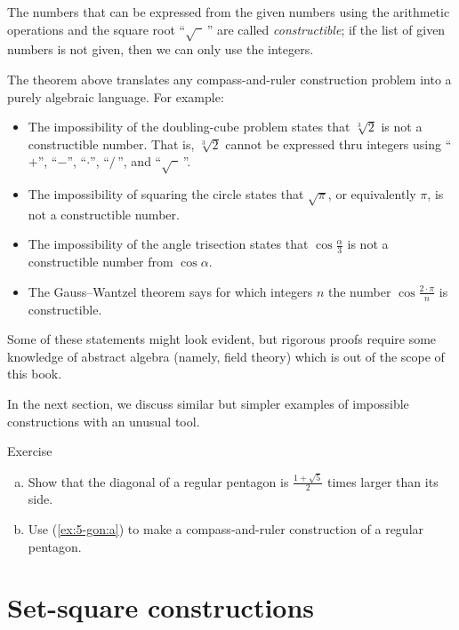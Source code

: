 The numbers that can be expressed from the given numbers using the arithmetic operations and the square root ``$\sqrt{\phantom{a}}\,$'' are called \emph{constructible};
if the list of given numbers is not given, then we can only use the integers.

{\sloppy
The theorem above translates any compass-and-ruler construction problem into a purely algebraic language.
For example:
\begin{itemize}
\item The impossibility of the doubling-cube problem states that $\sqrt[3]{2}$ is not a constructible number.
That is, $\sqrt[3]{2}$ cannot be expressed thru integers using
``$+$'', ``$-$'', ``$\cdot$'', ``$/\,$'', and ``$\sqrt{\phantom{a}}\,$''.

\item The impossibility of squaring the circle states that 
$\sqrt{\pi}$, or equivalently $\pi$, is not a constructible number.

\item The impossibility of the angle trisection states that $\cos\tfrac\alpha3$ is not a constructible number from $\cos\alpha$.

\item The Gauss--Wantzel theorem says for which integers $n$ the number 
$\cos\tfrac{2\cdot\pi}n$ is constructible.
\end{itemize} 
Some of these statements might look evident, 
but rigorous proofs require some knowledge of abstract algebra (namely, field theory)
which is out of the scope of this book. 

}

In the next section, we discuss similar but simpler examples of impossible constructions with an unusual tool.

\begin{thm}{Exercise}\label{ex:5-gon}
\begin{enumerate}[(a)]
 \item\label{ex:5-gon:a} Show that the diagonal of a regular pentagon is $\tfrac{1+\sqrt5}2$ times larger than its side.
 \item\label{ex:5-gon:b} Use (\ref{ex:5-gon:a}) to make a compass-and-ruler construction of a regular pentagon.
\end{enumerate}
\end{thm}

\section{Set-square constructions}

